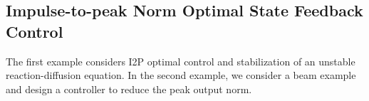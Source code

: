 \documentclass[letterpaper, 10 pt, conference]{ieeeconf}
\theoremstyle{definition}
\begin{document}
\subsection{Impulse-to-peak Norm Optimal State Feedback Control}



The first example considers I2P optimal control and stabilization of an unstable reaction-diffusion equation. In the second example, we consider a beam example and design a controller to reduce the peak output norm.
\end{document}
